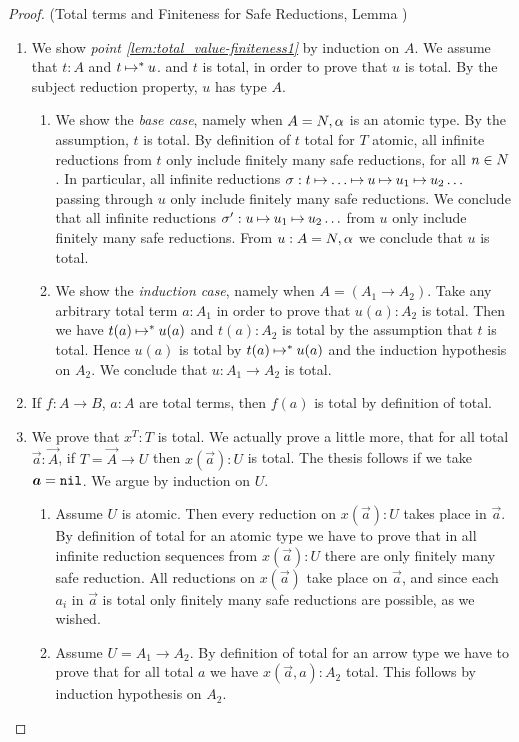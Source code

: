 \begin{proof}(Total terms and Finiteness for Safe Reductions, Lemma \label{lem:total_value-finiteness})
\begin{enumerate}

\item
  We show \emph{point \ref{lem:total_value-finiteness1}}  by induction on $A$. 
  We assume that $t:A$ and $t \mathbin{\mapsto} ^*u$.
    and $t$ is total, in order to prove that $u$ is total.
 By the subject reduction property, $u$ has type $A$.
\begin{enumerate}
\item
  We show the \emph{base case}, namely when $A ={N},\alpha$ is an atomic type.
  By the assumption, $t$ is total.
  By definition of $t$ total for $T$ atomic, all infinite 
  reductions from $t$ only include finitely many safe reductions, for all $n \in {N}$.
  In particular, all infinite reductions $\sigma: t \mathbin{\mapsto} \ldots \mathbin{\mapsto} 
  u \mathbin{\mapsto} u_1 \mathbin{\mapsto} u_2 \ldots$ 
  passing through $u$ only include finitely many safe reductions. We conclude that
  all infinite reductions 
  $\sigma': u \mathbin{\mapsto} u_1 \mathbin{\mapsto} u_2 \ldots$  from $u$
  only include finitely many safe reductions. From $u:A ={N},\alpha$ we conclude that  $u$ is total.
\item
  We show the \emph{induction case}, namely when $A = (A_1\rightarrow A_2)$.
  Take any arbitrary total term $a:A_1$ in order to prove that $u(a):A_2$ is total. 
  Then we have $t(a) \mathbin{\mapsto}^{*} u(a)$ and 
  $t(a):A_2$ is total by the assumption that $t$ is total.
  Hence $u(a)$ is total by $t(a) \mathbin{\mapsto}^{*} u(a)$ and the induction hypothesis on $A_2$. 
  We conclude that $u:A_1\rightarrow A_2$ is total. 
\end{enumerate}

  \item
If $f:A \rightarrow B$, $a:A$ are total  terms, then $f(a)$  is total by definition of total.

\item
We prove that $x^T:T$ is total. 
We actually prove a little more, 
that for all total $\vec{a}:\vec{A}$, if $T = \vec{A} \rightarrow U$ then $x(\vec{a}):U$
is total. The thesis follows if we take $\vec{a} = \nil$. We argue by induction on $U$. 

\begin{enumerate}
\item
Assume $U$ is atomic. Then every reduction on $x(\vec{a}):U$
takes place in $\vec{a}$. By definition of total
for an atomic type we have to prove that in all infinite reduction sequences from $x(\vec{a}):U$ 
there are only finitely many safe reduction. All reductions on $x(\vec{a})$ take place on $\vec{a}$,
and since each $a_i$ in $\vec{a}$ is total only finitely many safe reductions are possible, as we wished.
\item
Assume $U = A_1 \to A_2$. By definition of total
for an arrow type we have to prove that for all total $a$ we have  $x(\vec{a},a):A_2$ total.
This follows by induction hypothesis on $A_2$.
\end{enumerate}


\end{enumerate}
\end{proof}
